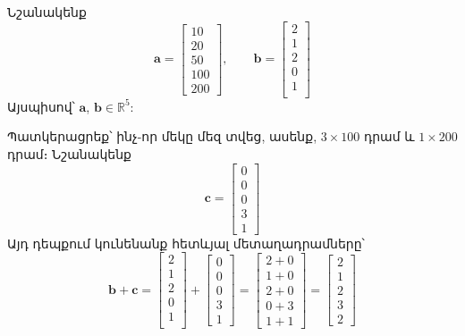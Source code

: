 Նշանակենք 
\[
\mathbf{a} = \begin{bmatrix}
10 \\ 20 \\ 50 \\ 100 \\ 200
\end{bmatrix}, \qquad \mathbf{b} = \begin{bmatrix}
2 \\1 \\2 \\0 \\1 \\
\end{bmatrix}
\]
Այսպիսով՝
 $\mathbf{a}$, $\mathbf{b} \in \mathbb{R}^5$:
 
Պատկերացրեք՝ ինչ-որ մեկը մեզ տվեց, ասենք, $3 \times 100$ դրամ և ${1 \times 200}$ դրամ։ Նշանակենք
\[
\mathbf{c} = \begin{bmatrix}
0 \\ 0 \\ 0 \\ 3 \\ 1
\end{bmatrix}
\]
Այդ դեպքում կունենանք հետևյալ մետաղադրամները՝
\[
\mathbf{b} + \mathbf{c} = \begin{bmatrix}
2 \\1 \\2 \\0 \\1 \\
\end{bmatrix} + \begin{bmatrix}
0 \\ 0 \\ 0 \\ 3 \\ 1
\end{bmatrix} = \begin{bmatrix}
2+0 \\ 1+0 \\ 2+0 \\ 0+3 \\ 1+1
\end{bmatrix} = \begin{bmatrix}
2 \\ 1 \\ 2 \\ 3 \\ 2
\end{bmatrix}
\]

